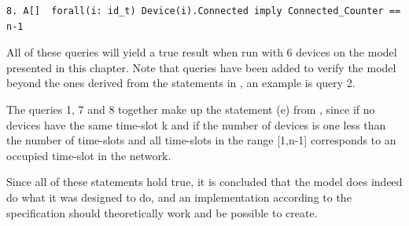 \begin{lstlisting}[style=UPPAAL, title={The query requires that if a device is connected, is it then true that the number of devices connected to a network is equal to one less the number of time-slots in the frame of a network. }]
8. A[]  forall(i: id_t) Device(i).Connected imply Connected_Counter == n-1
\end{lstlisting}

All of these queries will yield a true result when run with 6 devices on the model presented in this chapter.
Note that queries have been added to verify the model beyond the ones derived from the statements in , an example is query 2.

The queries 1, 7 and 8 together make up the statement (e) from , since if no devices have the same time-slot k and if the number of devices is one less than the number of time-slots and all time-slots in the range [1,n-1] corresponds to an occupied time-slot in the network.

Since all of these statements hold true, it is concluded that the model does indeed do what it was designed to do, and an implementation according to the specification should theoretically work and be possible to create.
